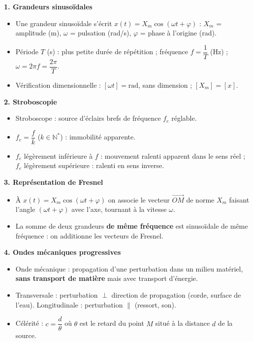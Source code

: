 \documentclass[11pt]{article}
\newcommand{\cle}[1]{{\popxbold\color{popdark}#1}}
\begin{document}
\begin{bilan}
\textbf{1. Grandeurs sinusoïdales}
\begin{itemize}
  \item Une grandeur \cle{sinusoïdale} s'écrit $x(t)=X_m\cos(\omega t+\varphi)$ : $X_m$ = \cle{amplitude} (m), $\omega$ = \cle{pulsation} (rad/s), $\varphi$ = \cle{phase à l'origine} (rad).
  \item \cle{Période} $T$ (s) : plus petite durée de répétition ; \cle{fréquence} $f=\dfrac{1}{T}$ (Hz) ; $\omega=2\pi f=\dfrac{2\pi}{T}$.
  \item Vérification dimensionnelle : $[\omega t]=\text{rad}$, sans dimension ; $[X_m]=[x]$.
\end{itemize}

\textbf{2. Stroboscopie}
\begin{itemize}
  \item Stroboscope : source d'éclairs brefs de fréquence $f_e$ réglable.
  \item $f_e=\dfrac{f}{k}$ ($k\in\mathbb{N}^*$) : \cle{immobilité apparente}.
  \item $f_e$ légèrement inférieure à $f$ : \cle{mouvement ralenti apparent} dans le sens réel ; $f_e$ légèrement supérieure : ralenti en sens inverse.
\end{itemize}

\textbf{3. Représentation de Fresnel}
\begin{itemize}
  \item À $x(t)=X_m\cos(\omega t+\varphi)$ on associe le vecteur $\overrightarrow{OM}$ de norme $X_m$ faisant l'angle $(\omega t+\varphi)$ avec l'axe, tournant à la vitesse $\omega$.
  \item La somme de deux grandeurs \textbf{de même fréquence} est sinusoïdale de même fréquence : on additionne les vecteurs de Fresnel.
\end{itemize}

\textbf{4. Ondes mécaniques progressives}
\begin{itemize}
  \item \cle{Onde mécanique} : propagation d'une perturbation dans un milieu matériel, \textbf{sans transport de matière} mais avec transport d'énergie.
  \item \cle{Transversale} : perturbation $\perp$ direction de propagation (corde, surface de l'eau). \cle{Longitudinale} : perturbation $\parallel$ (ressort, son).
  \item \cle{Célérité} : $c=\dfrac{d}{\theta}$ où $\theta$ est le retard du point $M$ situé à la distance $d$ de la source.
\end{itemize}


\end{bilan}
\end{document}

